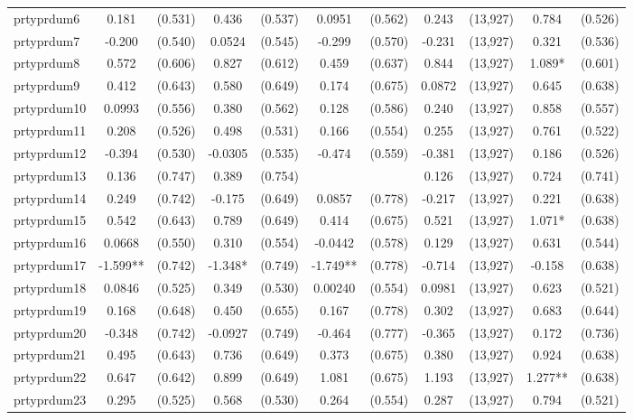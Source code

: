 \documentclass[]{article}
\begin{document}
\begin{tabular}{lcccccccccc}
prtyprdum6 & 0.181 & (0.531) & 0.436 & (0.537) & 0.0951 & (0.562) & 0.243 & (13,927) & 0.784 & (0.526) \\
prtyprdum7 & -0.200 & (0.540) & 0.0524 & (0.545) & -0.299 & (0.570) & -0.231 & (13,927) & 0.321 & (0.536) \\
prtyprdum8 & 0.572 & (0.606) & 0.827 & (0.612) & 0.459 & (0.637) & 0.844 & (13,927) & 1.089* & (0.601) \\
prtyprdum9 & 0.412 & (0.643) & 0.580 & (0.649) & 0.174 & (0.675) & 0.0872 & (13,927) & 0.645 & (0.638) \\
prtyprdum10 & 0.0993 & (0.556) & 0.380 & (0.562) & 0.128 & (0.586) & 0.240 & (13,927) & 0.858 & (0.557) \\
prtyprdum11 & 0.208 & (0.526) & 0.498 & (0.531) & 0.166 & (0.554) & 0.255 & (13,927) & 0.761 & (0.522) \\
prtyprdum12 & -0.394 & (0.530) & -0.0305 & (0.535) & -0.474 & (0.559) & -0.381 & (13,927) & 0.186 & (0.526) \\
prtyprdum13 & 0.136 & (0.747) & 0.389 & (0.754) &  &  & 0.126 & (13,927) & 0.724 & (0.741) \\
prtyprdum14 & 0.249 & (0.742) & -0.175 & (0.649) & 0.0857 & (0.778) & -0.217 & (13,927) & 0.221 & (0.638) \\
prtyprdum15 & 0.542 & (0.643) & 0.789 & (0.649) & 0.414 & (0.675) & 0.521 & (13,927) & 1.071* & (0.638) \\
prtyprdum16 & 0.0668 & (0.550) & 0.310 & (0.554) & -0.0442 & (0.578) & 0.129 & (13,927) & 0.631 & (0.544) \\
prtyprdum17 & -1.599** & (0.742) & -1.348* & (0.749) & -1.749** & (0.778) & -0.714 & (13,927) & -0.158 & (0.638) \\
prtyprdum18 & 0.0846 & (0.525) & 0.349 & (0.530) & 0.00240 & (0.554) & 0.0981 & (13,927) & 0.623 & (0.521) \\
prtyprdum19 & 0.168 & (0.648) & 0.450 & (0.655) & 0.167 & (0.778) & 0.302 & (13,927) & 0.683 & (0.644) \\
prtyprdum20 & -0.348 & (0.742) & -0.0927 & (0.749) & -0.464 & (0.777) & -0.365 & (13,927) & 0.172 & (0.736) \\
prtyprdum21 & 0.495 & (0.643) & 0.736 & (0.649) & 0.373 & (0.675) & 0.380 & (13,927) & 0.924 & (0.638) \\
prtyprdum22 & 0.647 & (0.642) & 0.899 & (0.649) & 1.081 & (0.675) & 1.193 & (13,927) & 1.277** & (0.638) \\
prtyprdum23 & 0.295 & (0.525) & 0.568 & (0.530) & 0.264 & (0.554) & 0.287 & (13,927) & 0.794 & (0.521) \\

\end{tabular}
\end{document}

